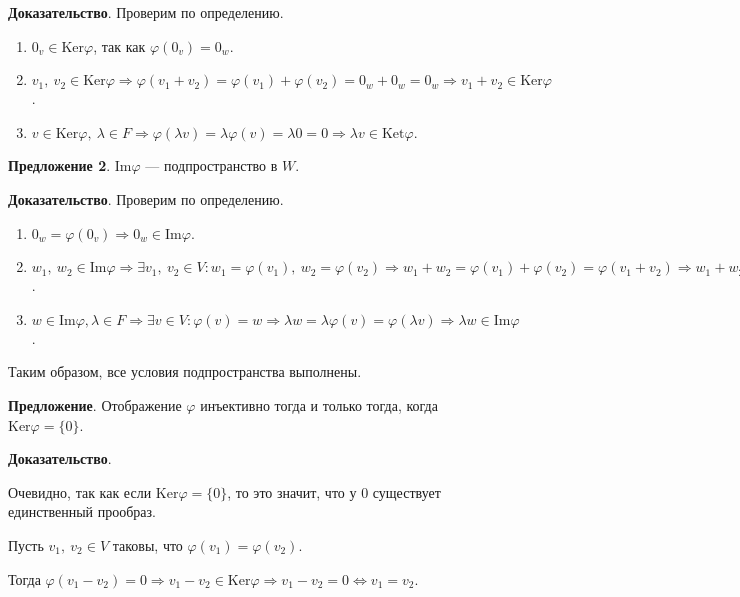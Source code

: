 \documentclass[a4paper, 12pt]{article}
\newcommand{\Ker}{\text{Ker}}
\renewcommand{\Im}{\text{Im}}
\newcommand*\circled[1]{\tikz[baseline=(char.base)]{
        \node[shape=circle,draw,inner sep=1.5pt] (char) {#1};}}
\begin{document}
\textbf{Доказательство}. Проверим по определению.
\vspace{-3mm}
\begin{enumerate}
\itemsep=-0.3em
\item $0_v \in \Ker\varphi$, так как $\varphi(0_v) = 0_w$.
\item $v_1,\ v_2 \in \Ker\varphi \Longrightarrow \varphi(v_1 + v_2) = \varphi(v_1) + \varphi(v_2) = 0_w + 0_w = 0_w \Longrightarrow v_1 + v_2 \in \Ker\varphi$.
\item $v \in \Ker\varphi,\ \lambda \in F \Longrightarrow \varphi(\lambda v) = \lambda \varphi(v) = \lambda 0 = 0 \Longrightarrow \lambda v \in \text{Ket}\varphi$.
\end{enumerate}

\textbf{Предложение 2}. $\Im\varphi$ --- подпространство в $W$.

\textbf{Доказательство}. Проверим по определению.
\vspace{-3mm}
\begin{enumerate}
\itemsep=-0.3em
\item $0_w = \varphi(0_v) \Longrightarrow 0_w \in \Im\varphi$.
\item $w_1,\ w_2 \in \Im\varphi \Longrightarrow \exists v_1,\ v_2 \in V: w_1 = \varphi(v_1),\ w_2 = \varphi(v_2) \Longrightarrow w_1 + w_2 = \varphi(v_1) + \varphi(v_2) = \varphi(v_1 + v_2) \Longrightarrow w_1 + w_2 \in \Im\varphi$.
\item $w \in \Im\varphi, \lambda \in F \Longrightarrow \exists v \in V: \varphi(v) = w \Longrightarrow \lambda w = \lambda\varphi(v) = \varphi(\lambda v) \Longrightarrow \lambda w \in \Im\varphi$.
\end{enumerate}

Таким образом, все условия подпространства выполнены.

\vspace{5mm}
\textbf{Предложение}. Отображение $\varphi$ инъективно тогда и только тогда, когда $\Ker\varphi = \{0\}$.

\textbf{Доказательство}.

\circled{$\Rightarrow$} Очевидно, так как если $\Ker\varphi = \{0\}$, то это значит, что у 0 существует единственный прообраз.

\circled{$\Leftarrow$} Пусть $v_1,\ v_2 \in V$ таковы, что $\varphi(v_1) = \varphi(v_2)$.

Тогда $\varphi(v_1 - v_2) = 0 \Longrightarrow v_1 - v_2 \in \Ker\varphi \Longrightarrow v_1 - v_2 = 0 \Longleftrightarrow v_1 = v_2$.
\end{document}
